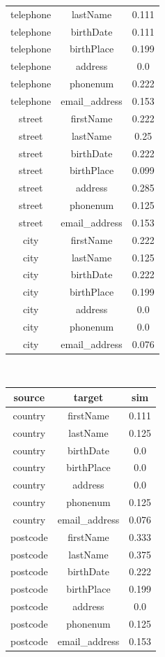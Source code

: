 \documentclass{scrartcl}
\begin{document}
\begin{enumerate}
\begin{center}
\begin{tabular}{|c|c|c|}
				telephone & lastName & 0.111\\
				telephone & birthDate & 0.111\\
				telephone & birthPlace & 0.199\\
				telephone & address & 0.0\\
				telephone & phonenum & 0.222\\
				telephone & email\_address & 0.153\\
				street & firstName & 0.222\\
				street & lastName & 0.25\\
				street & birthDate & 0.222\\
				street & birthPlace & 0.099\\
				street & address & 0.285\\
				street & phonenum & 0.125\\
				street & email\_address & 0.153\\
				city & firstName & 0.222\\
				city & lastName & 0.125\\
				city & birthDate & 0.222\\
				city & birthPlace & 0.199\\
				city & address & 0.0\\
				city & phonenum & 0.0\\
				city & email\_address & 0.076\\
				\hline
			\end{tabular}
			\\
			\vspace{0.3cm}
			\begin{tabular}{|c|c|c|}
				\hline
				source & target & sim\\
				\hline
				country & firstName & 0.111\\
				country & lastName & 0.125\\
				country & birthDate & 0.0\\
				country & birthPlace & 0.0\\
				country & address & 0.0\\
				country & phonenum & 0.125\\
				country & email\_address & 0.076\\
				postcode & firstName & 0.333\\
				postcode & lastName & 0.375\\
				postcode & birthDate & 0.222\\
				postcode & birthPlace & 0.199\\
				postcode & address & 0.0\\
				postcode & phonenum & 0.125\\
				postcode & email\_address & 0.153\\
				\hline
			\end{tabular}
		\end{center}
		

\end{enumerate}
\end{document}
